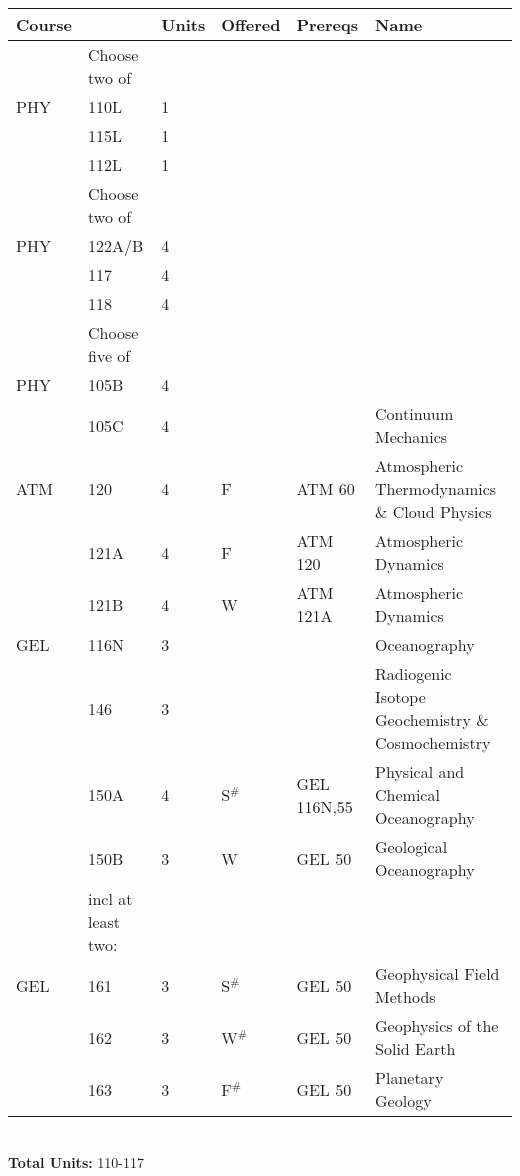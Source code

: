 \documentclass[12pt]{article}
\begin{document}
\begin{tabular}{|llllll|}
\hline
Course & & Units & Offered & Prereqs & Name \\
\hline
    & Choose two of & & & & \\
\hline
PHY & 110L   & 1 & & & \\
    & 115L   & 1 & & & \\
    & 112L   & 1 & & & \\
\hline
\hline
    & Choose two of & & & & \\
\hline
PHY & 122A/B & 4 & & & \\
    & 117   & 4 & & & \\
    & 118   & 4 & & & \\
\hline
\hline
    & Choose five of & & & & \\
\hline
PHY  & 105B   & 4 & &  & \\
     & 105C   & 4 & &  & Continuum Mechanics\\
ATM  & 120    & 4 & F  & ATM 60    & Atmospheric Thermodynamics \& Cloud Physics \\
     & 121A   & 4 & F  & ATM 120   & Atmospheric Dynamics \\
     & 121B   & 4 & W  & ATM 121A  & Atmospheric Dynamics \\
GEL  & 116N   & 3 &    & & Oceanography\\
     & 146    & 3 &    & & Radiogenic Isotope Geochemistry \& Cosmochemistry \\
     & 150A   & 4 & S$^\#$ & GEL 116N,55 & Physical and Chemical Oceanography\\
     & 150B   & 3 & W  & GEL 50      & Geological Oceanography\\
\hline
     & incl at least two:  & & & & \\
\hline
GEL  & 161    & 3 & S$^\#$ & GEL 50 & Geophysical Field Methods \\
     & 162    & 3 & W$^\#$ & GEL 50 & Geophysics of the Solid Earth \\
     & 163    & 3 & F$^\#$ & GEL 50 & Planetary Geology \\
\hline
\end{tabular}\\
\vskip 0.25cm
\noindent
{\bf Total Units:} 110-117 \\
\end{document}

